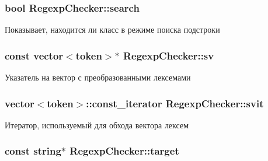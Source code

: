 \subsubsection[{\texorpdfstring{search}{search}}]{\setlength{\rightskip}{0pt plus 5cm}bool Regexp\+Checker\+::search\hspace{0.3cm}{\ttfamily [private]}}\hypertarget{class_regexp_checker_a76fa7992eddb6adcd63d9df0e5db1a92}{}\label{class_regexp_checker_a76fa7992eddb6adcd63d9df0e5db1a92}


Показывает, находится ли класс в режиме поиска подстроки 

\subsubsection[{\texorpdfstring{sv}{sv}}]{\setlength{\rightskip}{0pt plus 5cm}const vector$<${\bf token}$>$$\ast$ Regexp\+Checker\+::sv\hspace{0.3cm}{\ttfamily [private]}}\hypertarget{class_regexp_checker_a4542347ee72d793d080b046be483d397}{}\label{class_regexp_checker_a4542347ee72d793d080b046be483d397}


Указатель на вектор с преобразованными лексемами 

\subsubsection[{\texorpdfstring{svit}{svit}}]{\setlength{\rightskip}{0pt plus 5cm}vector$<${\bf token}$>$\+::const\+\_\+iterator Regexp\+Checker\+::svit\hspace{0.3cm}{\ttfamily [private]}}\hypertarget{class_regexp_checker_a9823ceadabc26fe4c9042a86dddb4e34}{}\label{class_regexp_checker_a9823ceadabc26fe4c9042a86dddb4e34}


Итератор, используемый для обхода вектора лексем 

\subsubsection[{\texorpdfstring{target}{target}}]{\setlength{\rightskip}{0pt plus 5cm}const string$\ast$ Regexp\+Checker\+::target\hspace{0.3cm}{\ttfamily [private]}}\hypertarget{class_regexp_checker_a9a5672b777e0718a778e9061c3f579e6}{}\label{class_regexp_checker_a9a5672b777e0718a778e9061c3f579e6}



